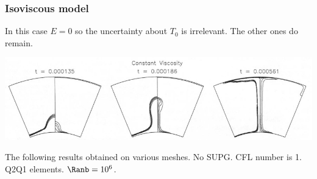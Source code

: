 \newpage
\subsubsection*{Isoviscous model}

In this case $E=0$ so the uncertainty about $T_0$ is irrelevant. The other ones do remain.

\begin{center}
\includegraphics[width=15cm]{python_codes/fieldstone_106/images/keki97b}
\end{center}

The following results obtained on various meshes. No SUPG. CFL number is 1. Q2Q1 elements. $\Ranb=10^6$. 

